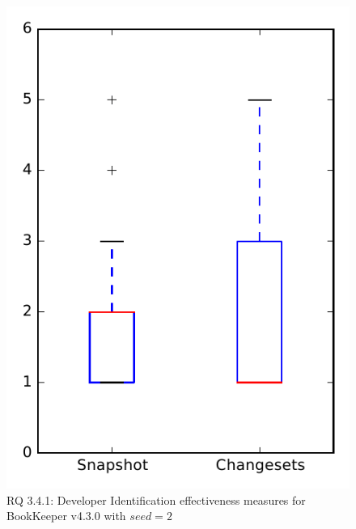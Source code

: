 
\begin{figure}
\centering
\includegraphics[height=0.4\textheight]{figures/dit_seed/rq1_bookkeeper_2}
\caption{RQ 3.4.1: Developer Identification effectiveness measures for BookKeeper v4.3.0 with $seed=2$}
\label{fig:dit_seed:rq1:bookkeeper}
\end{figure}
